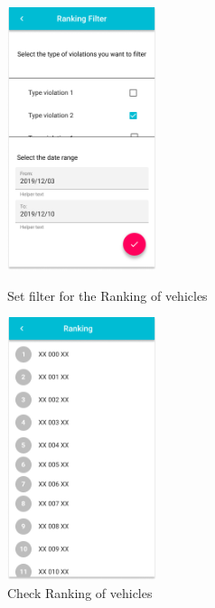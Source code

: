 \documentclass{article}
\begin{document}
\begin{figure}[!htb]
	\centering
	\begin{minipage}{.45\textwidth}
		\centering
		\includegraphics[height=7.7cm,keepaspectratio]{images/mockups/Ranking_Filter.png}
		\caption{Set filter for the Ranking of vehicles}
	\end{minipage}\quad
	\begin{minipage}{.45\textwidth} 
		\centering
		\includegraphics[height=7.7cm,keepaspectratio]{images/mockups/Ranking.png}
		\caption{Check Ranking of vehicles}
	\end{minipage}
\end{figure}

\clearpage
\end{document}
